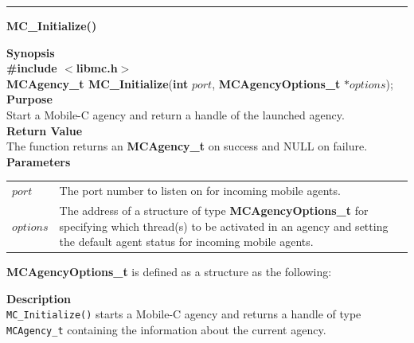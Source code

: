 \label{api:MC_Initialize}
\noindent
\vspace{5pt}
\rule{6.5in}{0.015in}
\noindent
{\LARGE \bf MC\_Initialize()}\\
{}

\noindent
{\bf Synopsis}\\
{\bf \#include $<$libmc.h$>$}\\
{\bf MCAgency\_t MC\_Initialize}({\bf int} $port$, {\bf MCAgencyOptions\_t} $*options$);\\

\noindent
{\bf Purpose}\\
Start a Mobile-C agency and return a handle of the launched agency.\\

\noindent
{\bf Return Value}\\
The function returns an {\bf MCAgency\_t} on success and NULL on failure.\\

\noindent
{\bf Parameters}
\vspace{-0.1in}
\begin{description}
\item
\begin{tabular}{p{10 mm}p{145 mm}}
$port$ & The port number to listen on for incoming mobile agents.\\
$options$ & The address of a structure of type {\bf MCAgencyOptions\_t} for 
specifying which thread(s) to be activated in an agency and setting the 
default agent status for incoming mobile agents.
\end{tabular}
\end{description}
{\bf MCAgencyOptions\_t} is defined as a structure as the following:


\noindent
{\bf Description}\\
\texttt{MC\_Initialize()} starts a Mobile-C agency and returns a handle of 
type \texttt{MCAgency\_t} containing the information about the current agency.

